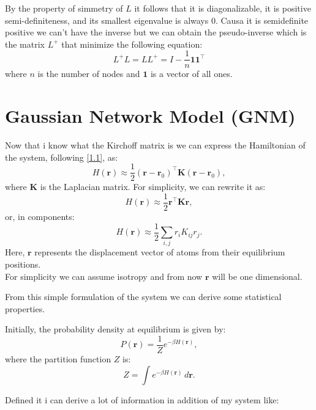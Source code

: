 \documentclass[English, Lau, oneside]{sapthesis}
\begin{document}
By the property of simmetry of \( L \)  it follows that it is diagonalizable, it is positive semi-definiteness, and its smallest eigenvalue is always 0.
Causa it is semidefinite positive we can't have the inverse but we can obtain the pseudo-inverse which is the matrix \( L^+ \) that minimize the following equation: 
\[
L^+ L = L L^+ = I - \frac{1}{n} \mathbf{1} \mathbf{1}^\top
\]
where \( n \) is the number of nodes and \( \mathbf{1} \) is a vector of all ones.




\newpage
\section{Gaussian Network Model (GNM)}
\noindent Now that i know what the Kirchoff matrix is we can express the Hamiltonian of the system, following \eqref{1.1}, as:\cite{ref12}
\begin{equation}
    H(\mathbf{r}) \approx \frac{1}{2} (\mathbf{r} - \mathbf{r}_0)^\top \mathbf{K} (\mathbf{r} - \mathbf{r}_0),
\end{equation}
where \( \mathbf{K} \) is the Laplacian matrix. For simplicity, we can rewrite it as:
\begin{equation}
    H(\mathbf{r}) \approx \frac{1}{2} \mathbf{r}^\top \mathbf{K} \mathbf{r},
\end{equation}
or, in components:
\begin{equation}
    H(\mathbf{r}) \approx \frac{1}{2} \sum_{i,j} r_i K_{ij} r_j.
\end{equation}
Here, \(\mathbf{r}\) represents the displacement vector of atoms from their equilibrium positions.\\
For simplicity we can assume isotropy and from now \(\mathbf{r}\) will be one dimensional.

From this simple formulation of the system we can derive some statistical properties.

Initially, the probability density at equilibrium is given by:\cite{ref12}
\begin{equation}
    P(\mathbf{r}) = \frac{1}{Z} e^{-\beta H(\mathbf{r})},
\end{equation}
where the partition function \(Z\) is:
\begin{equation}
    Z = \int e^{-\beta H(\mathbf{r})} \, d\mathbf{r}.
\end{equation}

Defined it i can derive a lot of information in addition of my system like:
\end{document}
